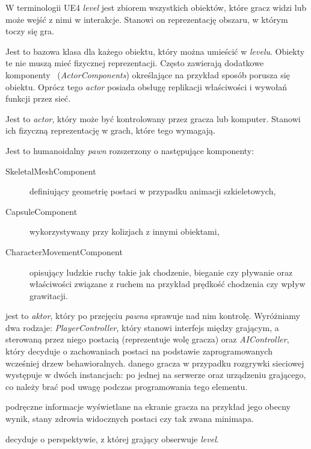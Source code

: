 \documentclass[multip]{SGGW-thesis}
\begin{document}
\begin{description}[itemsep=1\itemsep,parsep=1\parsep,partopsep=1\partopsep,topsep=1\topsep]
\item[Level:] W terminologii UE4 {\em level} jest zbiorem wszystkich obiektów, które gracz widzi lub może wejść z nimi w interakcje. Stanowi on reprezentację obszaru, w którym toczy się gra.
\item[Actor:]Jest to bazowa klasa dla każego obiektu, który można umieścić w {\em levelu}. Obiekty te nie muszą mieć fizycznej reprezentacji. Często zawierają dodatkowe komponenty ~({\em ActorComponents}) określające na przykład sposób porusza się obiektu. Oprócz tego {\em actor} posiada obsługę replikacji właściwości i wywołań funkcji przez sieć.
\item[Pawn:]Jest to {\em actor}, który może być kontrolowany przez gracza lub komputer. Stanowi ich fizyczną reprezentację w grach, które tego wymagają.
\item[Character:]Jest to humanoidalny {\em pawn} rozszerzony o następujące komponenty:
	\begin{description}
	\item[SkeletalMeshComponent] definiujący geometrię postaci w przypadku animacji szkieletowych,
	\item[CapsuleComponent] wykorzystywany przy kolizjach z innymi obiektami,
	\item[CharacterMovementComponent] opisujący ludzkie ruchy takie jak chodzenie, bieganie czy pływanie oraz właściwości związane z ruchem na przykład prędkość chodzenia czy wpływ grawitacji.
	\end{description}
\item[Controller:] jest to {\em aktor}, który po przejęciu {\em pawna} sprawuje nad nim kontrolę. Wyróżniamy dwa rodzaje: {\em PlayerController}, który stanowi interfejs między grającym, a sterowaną przez niego postacią (reprezentuje wolę gracza) oraz {\em AIController}, który decyduje o zachowaniach postaci na podstawie zaprogramowanych wcześniej drzew behawioralnych.
 danego gracza w przypadku rozgrywki sieciowej występuje w dwóch instancjach: po jednej na serwerze oraz urządzeniu grającego, co należy brać pod uwagę podczas programowania tego elementu.
\item[HUD ({\em ang. head-up display}):] podręczne informacje wyświetlane na ekranie gracza na przykład jego obecny wynik, stany zdrowia widocznych postaci czy tak zwana minimapa.
\item[Camera:] decyduje o perspektywie, z której grający obserwuje {\em level}.

\end{description}
\end{document}

